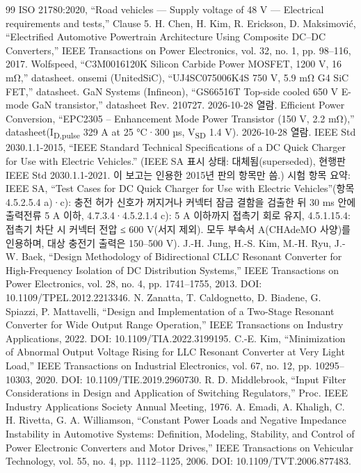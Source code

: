 \begin{thebibliography}{99}
 ISO 21780:2020, “Road vehicles — Supply voltage of 48 V — Electrical requirements and tests,” Clause 5.
 H. Chen, H. Kim, R. Erickson, D. Maksimovi{\fallbackfont ć}, “Electrified Automotive Powertrain Architecture Using Composite DC–DC Converters,” IEEE Transactions on Power Electronics, vol. 32, no. 1, pp. 98–116, 2017.
 Wolfspeed, “C3M0016120K Silicon Carbide Power MOSFET, 1200 V, 16 mΩ,” datasheet.
 onsemi (UnitedSiC), “UJ4SC075006K4S 750 V, 5.9 mΩ G4 SiC FET,” datasheet.
 GaN Systems (Infineon), “GS66516T Top-side cooled 650 V E-mode GaN transistor,” datasheet Rev. 210727. 2026-10-28 열람.
 Efficient Power Conversion, “EPC2305 – Enhancement Mode Power Transistor (150 V, 2.2 mΩ),” datasheet(I\textsubscript{D,pulse} 329 A at 25 °C·300 µs, V\textsubscript{SD} 1.4 V). 2026-10-28 열람.
 IEEE Std 2030.1.1-2015, “IEEE Standard Technical Specifications of a DC Quick Charger for Use with Electric Vehicles.” (IEEE SA 표시 상태: 대체됨(superseded), 현행판 IEEE Std 2030.1.1-2021. 이 보고는 인용한 2015년 판의 항목만 씀.) 시험 항목 요약: IEEE SA, “Test Cases for DC Quick Charger for Use with Electric Vehicles”(항목 4.5.2.5.4 a)·c): 충전 허가 신호가 꺼지거나 커넥터 잠금 결함을 검출한 뒤 30 ms 안에 출력전류 5 A 이하, 4.7.3.4·4.5.2.1.4 c): 5 A 이하까지 접촉기 회로 유지, 4.5.1.15.4: 접촉기 차단 시 커넥터 전압 ≤ 600 V(서지 제외). 모두 부속서 A(CHAdeMO 사양)를 인용하며, 대상 충전기 출력은 150–500 V).
 J.-H. Jung, H.-S. Kim, M.-H. Ryu, J.-W. Baek, “Design Methodology of Bidirectional CLLC Resonant Converter for High-Frequency Isolation of DC Distribution Systems,” IEEE Transactions on Power Electronics, vol. 28, no. 4, pp. 1741–1755, 2013. DOI: 10.1109/TPEL.2012.2213346.
 N. Zanatta, T. Caldognetto, D. Biadene, G. Spiazzi, P. Mattavelli, “Design and Implementation of a Two-Stage Resonant Converter for Wide Output Range Operation,” IEEE Transactions on Industry Applications, 2022. DOI: 10.1109/TIA.2022.3199195.
 C.-E. Kim, “Minimization of Abnormal Output Voltage Rising for LLC Resonant Converter at Very Light Load,” IEEE Transactions on Industrial Electronics, vol. 67, no. 12, pp. 10295–10303, 2020. DOI: 10.1109/TIE.2019.2960730.
 R. D. Middlebrook, “Input Filter Considerations in Design and Application of Switching Regulators,” Proc. IEEE Industry Applications Society Annual Meeting, 1976.
 A. Emadi, A. Khaligh, C. H. Rivetta, G. A. Williamson, “Constant Power Loads and Negative Impedance Instability in Automotive Systems: Definition, Modeling, Stability, and Control of Power Electronic Converters and Motor Drives,” IEEE Transactions on Vehicular Technology, vol. 55, no. 4, pp. 1112–1125, 2006. DOI: 10.1109/TVT.2006.877483.

\end{thebibliography}
